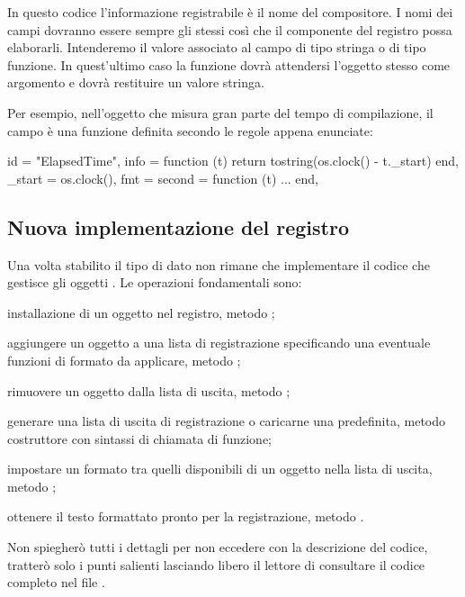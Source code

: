 In questo codice l'informazione registrabile è il nome del compositore. I nomi
dei campi dovranno essere sempre gli stessi così che il componente del registro
possa elaborarli. Intenderemo il valore associato al campo  di tipo
stringa o di tipo funzione. In quest'ultimo caso la funzione dovrà attendersi
l'oggetto stesso come argomento e dovrà restituire un valore stringa.

Per esempio, nell'oggetto  che misura gran parte del tempo di
compilazione, il campo  è una funzione definita secondo le regole
appena enunciate:
\begin{lines}
{
    id = "ElapsedTime",
    info = function (t)
        return tostring(os.clock() - t._start)
    end,
    _start = os.clock(),
    fmt = {
        second = function (t) ... end,
    }
}
\end{lines}


\subsection{Nuova implementazione del registro}

Una volta stabilito il tipo di dato non rimane che implementare il codice che
gestisce gli oggetti . Le operazioni fondamentali sono:
\begin{compactitemize}
\item installazione di un oggetto  nel registro, metodo ;
\item aggiungere un oggetto a una lista di registrazione specificando una
eventuale funzioni di formato da applicare, metodo ;
\item rimuovere un oggetto  dalla lista di uscita, metodo
;
\item generare una lista di uscita di registrazione o caricarne una predefinita,
metodo costruttore con sintassi di chiamata di funzione;
\item impostare un formato tra quelli disponibili di un oggetto  nella
lista di uscita, metodo ;
\item ottenere il testo formattato pronto per la registrazione, metodo
.
\end{compactitemize}

Non spiegherò tutti i dettagli per non eccedere con la descrizione del codice,
tratterò solo i punti salienti lasciando libero il lettore di consultare il
codice completo nel file .

